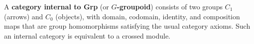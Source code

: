 A \textbf{category internal to Grp} (or \textbf{$G$-groupoid}) consists of two groups $C_1$ (arrows) and $C_0$ (objects), with domain, codomain, identity, and composition maps that are group homomorphisms satisfying the usual category axioms. Such an internal category is equivalent to a crossed module.